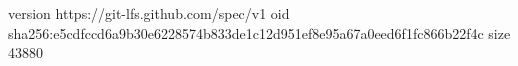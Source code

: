 version https://git-lfs.github.com/spec/v1
oid sha256:e5cdfccd6a9b30e6228574b833de1c12d951ef8e95a67a0eed6f1fc866b22f4c
size 43880
